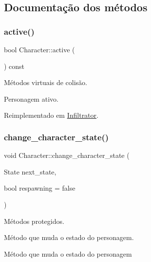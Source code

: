 \subsection{Documentação dos métodos}
\mbox{\label{classCharacter_adbe9684ed82ce4b053881c1a31f2aa97}} 
\subsubsection{\texorpdfstring{active()}{active()}}
{\footnotesize\ttfamily bool Character\+::active (\begin{DoxyParamCaption}{ }\end{DoxyParamCaption}) const\hspace{0.3cm}{\ttfamily [virtual]}}



Métodos virtuais de colisão. 

Personagem ativo. 

Reimplementado em \mbox{\hyperlink{classInfiltrator_ae423f60190c1df91dcccb7e313845171}{Infiltrator}}.

\mbox{\label{classCharacter_a067f09af5430da58cc9698421fb84814}} 
\subsubsection{\texorpdfstring{change\+\_\+character\+\_\+state()}{change\_character\_state()}}
{\footnotesize\ttfamily void Character\+::change\+\_\+character\+\_\+state (\begin{DoxyParamCaption}\item[{State}]{next\+\_\+state,  }\item[{bool}]{respawning = {\ttfamily false} }\end{DoxyParamCaption})\hspace{0.3cm}{\ttfamily [protected]}}



Métodos protegidos. 

Método que muda o estado do personagem.

Método que muda o estado do personagem \mbox{\label{classCharacter_a2edbbba1c9e07eece34c25f651e364d9}} 
